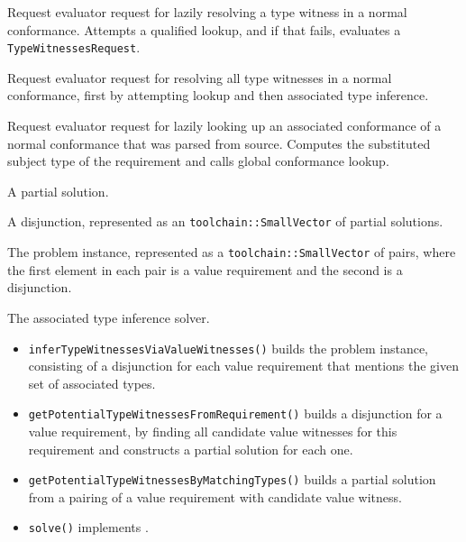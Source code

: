 \documentclass[../generics]{subfiles}
\begin{document}
Request evaluator request for lazily resolving a type witness in a normal conformance. Attempts a qualified lookup, and if that fails, evaluates a \texttt{TypeWitnessesRequest}.

Request evaluator request for resolving all type witnesses in a normal conformance, first by attempting lookup and then associated type inference.

Request evaluator request for lazily looking up an associated conformance of a normal conformance that was parsed from source. Computes the substituted subject type of the requirement and calls global conformance lookup.

A partial solution.

A disjunction, represented as an \verb|toolchain::SmallVector| of partial solutions.

The problem instance, represented as a \verb|toolchain::SmallVector| of pairs, where the first element in each pair is a value requirement and the second is a disjunction.

The associated type inference solver.
\begin{itemize}
\item \texttt{inferTypeWitnessesViaValueWitnesses()} builds the problem instance, consisting of a disjunction for each value requirement that mentions the given set of associated types.
\item \texttt{getPotentialTypeWitnessesFromRequirement()} builds a disjunction for a value requirement, by finding all candidate value witnesses for this requirement and constructs a partial solution for each one.
\item \texttt{getPotentialTypeWitnessesByMatchingTypes()} builds a partial solution from a pairing of a value requirement with candidate value witness.
\item \texttt{solve()} implements .
\end{itemize}
\end{document}
